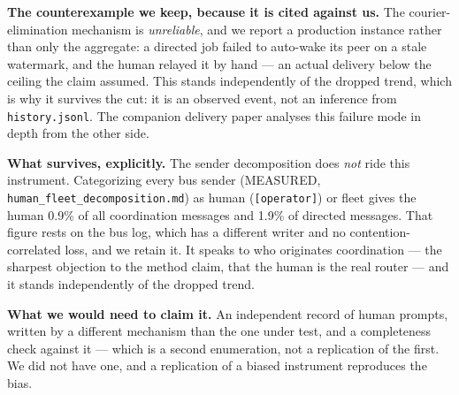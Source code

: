 \documentclass[10pt,conference]{IEEEtran}   %
\begin{document}
\textbf{The counterexample we keep, because it is cited against us.} The
courier-elimination mechanism is \emph{unreliable}, and we report a production instance rather than
only the aggregate: a directed job failed to auto-wake its peer on a stale watermark, and the human
relayed it by hand --- an actual delivery below the ceiling the claim assumed. This stands
independently of the dropped trend, which is why it survives the cut: it is an observed
event, not an inference from \texttt{history.jsonl}. The companion delivery paper analyses this
failure mode in depth from the other side.

\textbf{What survives, explicitly.} The sender decomposition does \emph{not} ride this instrument.
Categorizing every bus sender (MEASURED, \texttt{human\_fleet\_decomposition.md}) as human
(\texttt{[operator]}) or fleet gives the human 0.9\% of all coordination messages and 1.9\% of
directed messages. That figure rests on the bus log, which has a different writer and no
contention-correlated loss, and we retain it. It speaks to who originates coordination --- the
sharpest objection to the method claim, that the human is the real router --- and it stands
independently of the dropped trend.

\textbf{What we would need to claim it.} An independent record of human prompts, written by a
different mechanism than the one under test, and a completeness check against it --- which is a
second enumeration, not a replication of the first. We did not have one, and a replication of a
biased instrument reproduces the bias.
\end{document}
